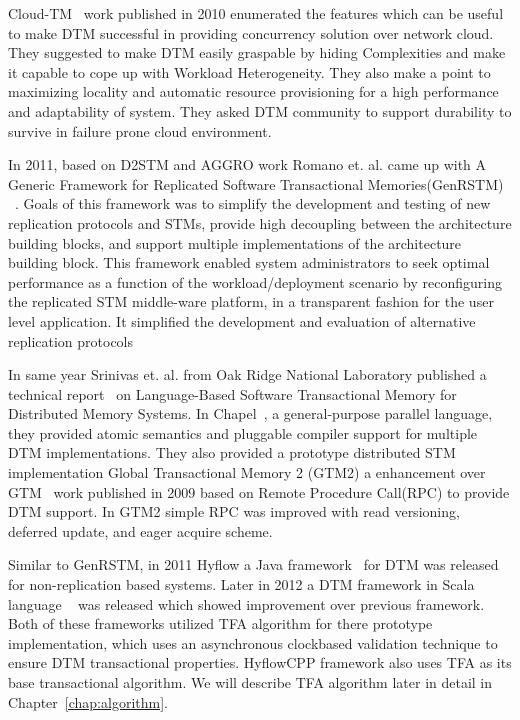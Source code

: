 \documentclass[12pt,english]{report}
\begin{document}
Cloud-TM~\cite{Romano:2010:CHC:1773912.1773914} work published in 2010 enumerated the features which can be useful to make DTM successful in providing concurrency solution over network cloud. They suggested to make DTM easily graspable by hiding Complexities and make it capable to cope up with Workload Heterogeneity. They also make a point to maximizing locality and automatic resource provisioning for a high performance and adaptability of system. They asked DTM community to support durability to survive in failure prone cloud environment. 

In 2011, based on D2STM and AGGRO work Romano et. al. came up with A Generic Framework for Replicated Software Transactional Memories(GenRSTM) ~\cite{GenRSTM:6038614}. Goals of this framework was to simplify the development and testing of new replication protocols and STMs, provide high decoupling between the architecture building blocks, and support multiple implementations of the architecture building block. This framework enabled system administrators to seek optimal performance as a function of the workload/deployment scenario by reconfiguring the replicated STM middle-ware platform, in a transparent fashion for the
user level application. It simplified the development and evaluation of alternative replication protocols

In same year Srinivas et. al. from Oak Ridge National Laboratory published a technical report~\cite{sridharan2011scalable} on Language-Based Software Transactional Memory for Distributed Memory Systems. In Chapel~\cite{chapel:Language}, a general-purpose parallel language, they provided atomic semantics and pluggable compiler support for multiple DTM implementations. They also provided a prototype distributed STM implementation Global Transactional Memory 2 (GTM2) a enhancement over GTM~\cite{sridharan2009scalable} work published in 2009 based on Remote Procedure Call(RPC) to provide DTM  support. In GTM2 simple RPC was improved with read versioning, deferred update, and eager acquire scheme.

Similar to GenRSTM, in 2011 Hyflow a Java framework~\cite{Saad:2011:HHP:1996130.1996167} for DTM was released for non-replication based systems. Later in 2012 a DTM framework in Scala language ~\cite{turcuhyflow2}  was released which showed improvement over previous framework. Both of these frameworks utilized TFA algorithm for there prototype implementation, which uses an asynchronous clockbased validation technique to ensure DTM transactional properties. HyflowCPP framework also uses TFA as its base transactional algorithm. We will describe TFA algorithm later in detail in Chapter~\ref{chap:algorithm}.
\end{document}
